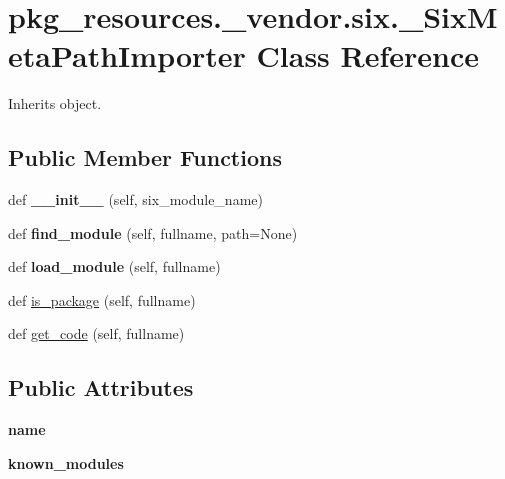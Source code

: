 \hypertarget{classpkg__resources_1_1__vendor_1_1six_1_1___six_meta_path_importer}{}\section{pkg\+\_\+resources.\+\_\+vendor.\+six.\+\_\+\+Six\+Meta\+Path\+Importer Class Reference}
\label{classpkg__resources_1_1__vendor_1_1six_1_1___six_meta_path_importer}


Inherits object.

\subsection*{Public Member Functions}
\begin{DoxyCompactItemize}
\item 
\mbox{\label{classpkg__resources_1_1__vendor_1_1six_1_1___six_meta_path_importer_a7987fc1950788d2bbdc4c800fb18a7dd}} 
def {\bfseries \+\_\+\+\_\+init\+\_\+\+\_\+} (self, six\+\_\+module\+\_\+name)
\item 
\mbox{\label{classpkg__resources_1_1__vendor_1_1six_1_1___six_meta_path_importer_a6a5d9309b2e39af0f9154ccca83502f0}} 
def {\bfseries find\+\_\+module} (self, fullname, path=None)
\item 
\mbox{\label{classpkg__resources_1_1__vendor_1_1six_1_1___six_meta_path_importer_ab72a0de7983409c0b10497cf94c6cd91}} 
def {\bfseries load\+\_\+module} (self, fullname)
\item 
def \hyperlink{classpkg__resources_1_1__vendor_1_1six_1_1___six_meta_path_importer_ac8e56aa8545e7ad33bc26aac169c2b10}{is\+\_\+package} (self, fullname)
\item 
def \hyperlink{classpkg__resources_1_1__vendor_1_1six_1_1___six_meta_path_importer_ade2b7f51d57f3b7ee68c99860908a660}{get\+\_\+code} (self, fullname)
\end{DoxyCompactItemize}
\subsection*{Public Attributes}
\begin{DoxyCompactItemize}
\item 
\mbox{\label{classpkg__resources_1_1__vendor_1_1six_1_1___six_meta_path_importer_a8e13d0ea466fd54f628500605803a68f}} 
{\bfseries name}
\item 
\mbox{\label{classpkg__resources_1_1__vendor_1_1six_1_1___six_meta_path_importer_ae0f0cb99d40726a0c1cf7dbdde254486}} 
{\bfseries known\+\_\+modules}
\end{DoxyCompactItemize}
